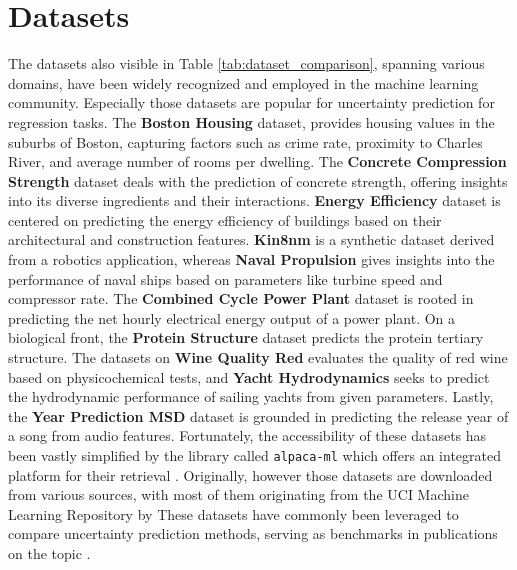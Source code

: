\documentclass{article}
\begin{document}
\section{Datasets}
The datasets also visible in Table \ref{tab:dataset_comparison}, spanning various domains, have been widely recognized and employed in the machine learning community. Especially those datasets are popular for uncertainty prediction for regression tasks. The \textbf{Boston Housing} dataset, provides housing values in the suburbs of Boston, capturing factors such as crime rate, proximity to Charles River, and average number of rooms per dwelling. The \textbf{Concrete Compression Strength} dataset deals with the prediction of concrete strength, offering insights into its diverse ingredients and their interactions. \textbf{Energy Efficiency} dataset is centered on predicting the energy efficiency of buildings based on their architectural and construction features. \textbf{Kin8nm} is a synthetic dataset derived from a robotics application, whereas \textbf{Naval Propulsion} gives insights into the performance of naval ships based on parameters like turbine speed and compressor rate. The \textbf{Combined Cycle Power Plant} dataset is rooted in predicting the net hourly electrical energy output of a power plant. On a biological front, the \textbf{Protein Structure} dataset predicts the protein tertiary structure. The datasets on \textbf{Wine Quality Red} evaluates the quality of red wine based on physicochemical tests, and \textbf{Yacht Hydrodynamics} seeks to predict the hydrodynamic performance of sailing yachts from given parameters. Lastly, the \textbf{Year Prediction MSD} dataset is grounded in predicting the release year of a song from audio features. Fortunately, the accessibility of these datasets has been vastly simplified by the library called \texttt{alpaca-ml} which offers an integrated platform for their retrieval \cite{alpaca2023}. Originally, however those datasets are downloaded from various sources, with most of them originating from the UCI Machine Learning Repository by \cite{kelly2023uci} These datasets have commonly been leveraged to compare uncertainty prediction methods, serving as benchmarks in publications on the topic \cite{gal_dropout_2016, lakshminarayanan_ensembles_2017, hernandez2015probabilistic}.
\end{document}
